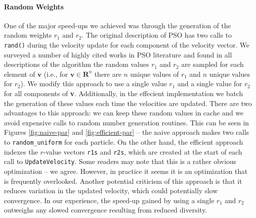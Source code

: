 \paragraph{Random Weights} One of the major speed-ups we achieved was through
the generation of the random weights $r_1$ and $r_2$. The original description of
PSO \cite{pso} has two calls to \texttt{rand()} during the velocity update for each
component of the velocity vector. We surveyed a number of highly cited works in
PSO literature \cite{pso-development, pso-overview, pso-tutorial} and found in
all descriptions of the algorithm the random values $r_1$ and $r_2$ are sampled
for each element of $\textbf{v}$ (i.e., for $\textbf{v}\in\mathbf{R}^n$ there
are $n$ unique values of $r_1$ and $n$ unique values for $r_2$). We modify this
approach to use a single value $r_1$ and a single value for $r_2$ for all
components of \textbf{v}. Additionally, in the effecient implementation we batch
the generation of these values each time the velocities are updated.
There are two advantages to this approach: we can keep
these random values in cache and we avoid expensive calls to random number
generation routines. This can be seen in Figures \ref{fig:naive-par} and
\ref{fig:efficient-par} -- the naive approach makes two calls to
\texttt{random\_uniform} for each particle. On the other hand, the efficient
approach indexes the $r$-value vectors \texttt{r1s} and \texttt{r2s}, which are
created at the start of each call to \texttt{UpdateVelocity}. Some readers may
note that this is a rather obvious optimization -- we agree. However, in
practice it seems it is an optimization that is frequently overlooked.
Another potential criticism of this approach is that it reduces variation in the
updated velocity, which could potentially slow convergence. In our experience,
the speed-up gained by using a single $r_1$ and $r_2$ outweighs any slowed
convergence resulting from reduced diversity.

